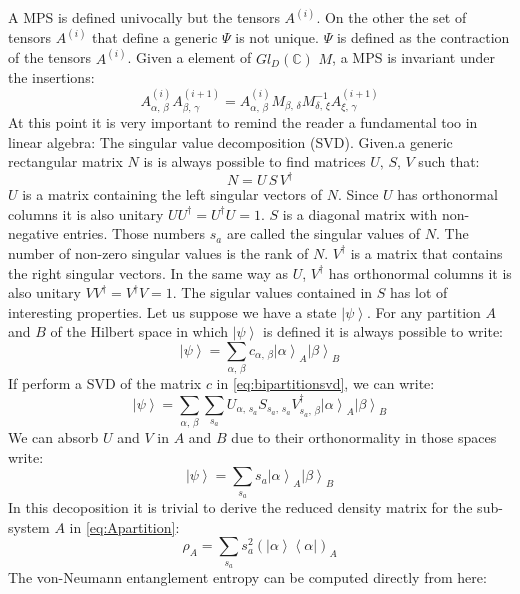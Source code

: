 \documentclass[12pt, a4paper, twoside, titlepage]{article}
\newcommand{\ket}[1]{\ensuremath{\left|#1\right\rangle}}
\newcommand{\bra}[1]{\ensuremath{\left\langle#1\right|}}
\begin{document}
A MPS is defined univocally but the tensors $A^{(i)}$. On the other the set of tensors $A^{(i)}$ that define a generic $\Psi$ is not unique. $\Psi$ is defined as the contraction of the tensors $A^{(i)}$.
Given a element of $Gl_D(\mathbb{C})$ $M$, a MPS is invariant under the insertions:
\begin{equation}
A^{(i)}_{\alpha , \, \beta }A^{(i+1)}_{\beta, \, \gamma } = A^{(i)}_{\alpha , \, \beta }M_{{\beta, \, \delta } } M^{-1}_{{\delta , \, \xi } }A^{(i+1)}_{\xi, \, \gamma }
\end{equation}
At this point it is very important to remind the reader a fundamental too in linear algebra: The singular value decomposition (SVD). Given.a generic rectangular matrix $N$ is is always possible to find matrices $U, \, S, \, V$ such that:
\begin{equation}
N= U\,S\,V^\dag
\end{equation}
$U$ is a matrix containing the left singular vectors of $N$. Since $U$ has orthonormal columns it is also unitary $UU^\dagger=U^\dagger U=1$. $S$ is a diagonal matrix with non-negative entries. Those numbers $s_a$ are called the singular values of $N$. The number of non-zero singular values is the rank of $N$. $V^\dagger$ is a matrix that contains the right singular vectors. In the same way as  $U$, $V^\dagger$ has orthonormal columns it is also unitary $VV^\dagger=V^\dagger V=1$. The sigular values contained in $S$ has lot of interesting properties. Let us suppose we have a state $\ket \psi$. For any partition $A$ and $B$ of the Hilbert space in which $\ket \psi$ is defined it is always possible to write:
\begin{equation}\label{eq:bipartitionsvd}
\ket \psi = \sum_{\alpha, \, \beta} c_{\alpha, \, \beta} \ket{\alpha}_A \ket{\beta}_B
\end{equation}
If perform a SVD of the matrix $c$ in \cref{eq:bipartitionsvd}, we can write:
\begin{equation}
\ket \psi = \sum_{\alpha, \, \beta} \sum_{s_a} U_{\alpha, \, s_a} S_{s_a, \, s_a} V^\dagger_{s_a, \, \beta} \ket{\alpha}_A \ket{\beta}_B
\end{equation}
We can absorb $U$ and $V$ in $A$ and $B$ due to their orthonormality in those spaces write:
\begin{equation}
\ket \psi =  \sum_{s_a} s_a  \ket{\alpha}_A \ket{\beta}_B
\end{equation}
In this decoposition it is trivial to derive the reduced density matrix for the sub-system $A$ in \cref{eq:Apartition}:
\begin{equation}\label{eq:canonical_rho_a}
\rho_A =  \sum_{s_a} s^2_a  \left( \ket{\alpha} \bra{\alpha}\right)_A
\end{equation}
The von-Neumann entanglement entropy can be computed directly from here:
\end{document}
